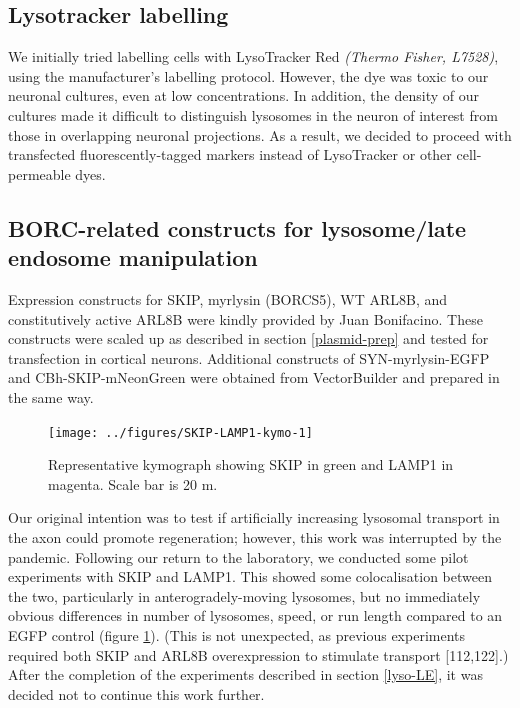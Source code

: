 \documentclass[
  12pt,
  a4paper,
]{book}
\begin{document}
\hypertarget{lysotracker-labelling}{%
\subsection{Lysotracker labelling}\label{lysotracker-labelling}}

We initially tried labelling cells with LysoTracker Red \emph{(Thermo Fisher, L7528)}, using the manufacturer's labelling protocol. However, the dye was toxic to our neuronal cultures, even at low concentrations. In addition, the density of our cultures made it difficult to distinguish lysosomes in the neuron of interest from those in overlapping neuronal projections. As a result, we decided to proceed with transfected fluorescently-tagged markers instead of LysoTracker or other cell-permeable dyes.

\hypertarget{borc-related-constructs-for-lysosomelate-endosome-manipulation}{%
\subsection{BORC-related constructs for lysosome/late endosome manipulation}\label{borc-related-constructs-for-lysosomelate-endosome-manipulation}}

Expression constructs for SKIP, myrlysin (BORCS5), WT ARL8B, and constitutively active ARL8B were kindly provided by Juan Bonifacino. These constructs were scaled up as described in section \ref{plasmid-prep} and tested for transfection in cortical neurons. Additional constructs of SYN-myrlysin-EGFP and CBh-SKIP-mNeonGreen were obtained from VectorBuilder and prepared in the same way.

\vspace{14pt}
\begin{figure}
\texttt{[image: ../figures/SKIP-LAMP1-kymo-1]} \caption[SKIP and LAMP1 representative kymograph]{Representative kymograph showing SKIP in green and LAMP1 in magenta.  Scale bar is 20 \textmu{}m.}\label{fig:SKIP-LAMP1-kymo}
\end{figure}

Our original intention was to test if artificially increasing lysosomal transport in the axon could promote regeneration; however, this work was interrupted by the pandemic. Following our return to the laboratory, we conducted some pilot experiments with SKIP and LAMP1. This showed some colocalisation between the two, particularly in anterogradely-moving lysosomes, but no immediately obvious differences in number of lysosomes, speed, or run length compared to an EGFP control (figure \ref{fig:SKIP-LAMP1-kymo}). (This is not unexpected, as previous experiments required both SKIP and ARL8B overexpression to stimulate transport {[}112,122{]}.) After the completion of the experiments described in section \ref{lyso-LE}, it was decided not to continue this work further.
\end{document}
